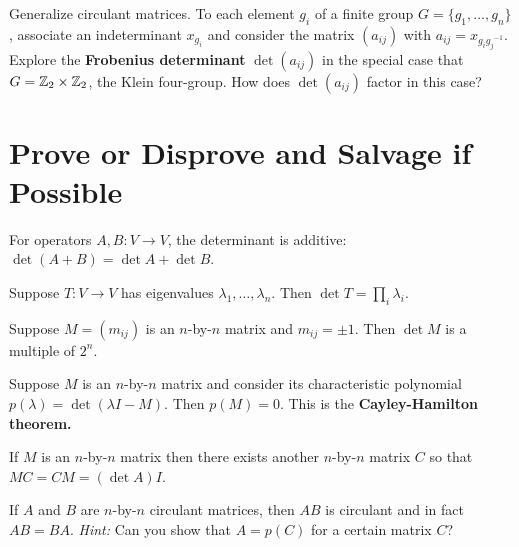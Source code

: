 \documentclass{homework}
\begin{document}
\begin{problem}
  Generalize circulant matrices.  To each element $g_i$ of a finite group $G = \{ g_1, \ldots, g_n \}$, associate an indeterminant $x_{g_i}$ and consider the matrix $(a_{ij})$ with $a_{ij} = x_{g_i {g_j}^{-1}}$.  Explore the \textbf{Frobenius determinant} $\det (a_{ij})$ in the special case that $G = \mathbb{Z}_2 \times \mathbb{Z}_2$, the Klein four-group.  How does  $\det (a_{ij})$ factor in this case?
\end{problem}



\section{Prove or Disprove and Salvage if Possible}

\begin{problem}%
  For operators $A, B : V \to V$, the determinant is additive: $\det (A+B) = \det A + \det B$.
\end{problem}

\begin{problem}%
  Suppose $T : V \to V$ has eigenvalues $\lambda_1,\ldots,\lambda_n$.
  Then $\det T = \prod_i \lambda_i$.
\end{problem}

\begin{problem} %
  Suppose $M = (m_{ij})$ is an $n$-by-$n$ matrix and $m_{ij} = \pm 1$.
  Then $\det M$ is a multiple of $2^{n}$.
\end{problem}

\begin{problem}
  Suppose $M$ is an $n$-by-$n$ matrix and consider its characteristic
  polynomial $p(\lambda) = \det(\lambda I - M)$.  Then $p(M) = 0$.  This is
  the \textbf{Cayley-Hamilton theorem.}
\end{problem}

\begin{problem}
  If $M$ is an $n$-by-$n$ matrix then there exists another $n$-by-$n$
  matrix $C$ so that $MC = CM = (\det A) I$.
\end{problem}

\begin{problem}
  If $A$ and $B$ are $n$-by-$n$ circulant matrices, then $AB$ is circulant and in fact $AB = BA$.
  \textit{Hint:} Can you show that $A = p(C)$ for a certain matrix $C$?
\end{problem}
\end{document}
